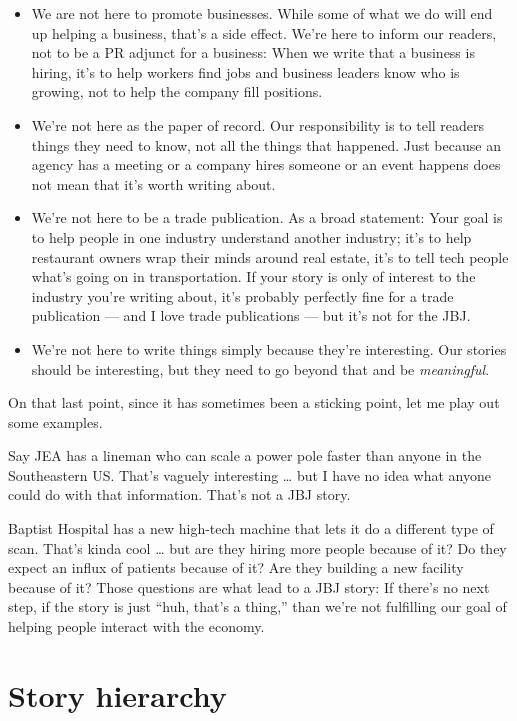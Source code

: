\documentclass[
  11pt,
  american,
  letterpaperpaper,
  extrafontsizes,onecolumn,openright
  ]{memoir}
\providecommand{\tightlist}{%
  \setlength{\itemsep}{0pt}\setlength{\parskip}{0pt}}
\newlength{\rf}
\begin{document}
\begin{itemize}
\tightlist
\item
  We are not here to promote businesses. While some of what we do will end up helping a business, that's a side effect. We're here to inform our readers, not to be a PR adjunct for a business: When we write that a business is hiring, it's to help workers find jobs and business leaders know who is growing, not to help the company fill positions.
\item
  We're not here as the paper of record. Our responsibility is to tell readers things they need to know, not all the things that happened. Just because an agency has a meeting or a company hires someone or an event happens does not mean that it's worth writing about.
\item
  We're not here to be a trade publication. As a broad statement: Your goal is to help people in one industry understand another industry; it's to help restaurant owners wrap their minds around real estate, it's to tell tech people what's going on in transportation. If your story is only of interest to the industry you're writing about, it's probably perfectly fine for a trade publication --- and I love trade publications --- but it's not for the JBJ.
\item
  We're not here to write things simply because they're interesting. Our stories should be interesting, but they need to go beyond that and be \emph{meaningful}.
\end{itemize}

On that last point, since it has sometimes been a sticking point, let me play out some examples.

Say JEA has a lineman who can scale a power pole faster than anyone in the Southeastern US. That's vaguely interesting \ldots{} but I have no idea what anyone could do with that information. That's not a JBJ story.

Baptist Hospital has a new high-tech machine that lets it do a different type of scan. That's kinda cool \ldots{} but are they hiring more people because of it? Do they expect an influx of patients because of it? Are they building a new facility because of it? Those questions are what lead to a JBJ story: If there's no next step, if the story is just \enquote{huh, that's a thing,} than we're not fulfilling our goal of helping people interact with the economy.

\hypertarget{story-hierarchy}{%
\section*{Story hierarchy}\label{story-hierarchy}}
\end{document}
